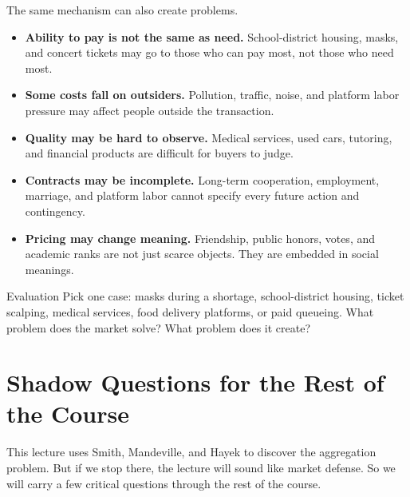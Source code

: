 \documentclass[10pt,a4paper]{article}
\begin{document}
The same mechanism can also create problems.

\begin{itemize}
  \item \textbf{Ability to pay is not the same as need.} School-district housing, masks, and concert tickets may go to those who can pay most, not those who need most.
  \item \textbf{Some costs fall on outsiders.} Pollution, traffic, noise, and platform labor pressure may affect people outside the transaction.
  \item \textbf{Quality may be hard to observe.} Medical services, used cars, tutoring, and financial products are difficult for buyers to judge.
  \item \textbf{Contracts may be incomplete.} Long-term cooperation, employment, marriage, and platform labor cannot specify every future action and contingency.
  \item \textbf{Pricing may change meaning.} Friendship, public honors, votes, and academic ranks are not just scarce objects. They are embedded in social meanings.
\end{itemize}

\begin{discussionbox}{Evaluation}
Pick one case: masks during a shortage, school-district housing, ticket scalping, medical services, food delivery platforms, or paid queueing. What problem does the market solve? What problem does it create?
\end{discussionbox}

\section{Shadow Questions for the Rest of the Course}

This lecture uses Smith, Mandeville, and Hayek to discover the aggregation problem. But if we stop there, the lecture will sound like market defense. So we will carry a few critical questions through the rest of the course.
\end{document}
